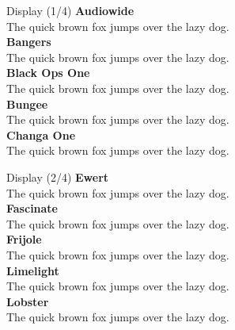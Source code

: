 \documentclass[10pt]{beamer}
\begin{document}
\begin{frame}{Display (1/4)}
\vspace{-0.2cm}
  {\AudiowideLocal\Large\bfseries Audiowide\\}
  {\AudiowideLocal The quick brown fox jumps over the lazy dog.\\[0.3cm]}
  {\BangersLocal\Large\bfseries Bangers\\}
  {\BangersLocal The quick brown fox jumps over the lazy dog.\\[0.3cm]}
  {\BlackOpsOneLocal\Large\bfseries Black Ops One\\}
  {\BlackOpsOneLocal The quick brown fox jumps over the lazy dog.\\[0.3cm]}
  {\BungeeLocal\Large\bfseries Bungee\\}
  {\BungeeLocal The quick brown fox jumps over the lazy dog.\\[0.3cm]}
  {\ChangaOneLocal\Large\bfseries Changa One\\}
  {\ChangaOneLocal The quick brown fox jumps over the lazy dog.\\[0.3cm]}
\end{frame}

\begin{frame}{Display (2/4)}
\vspace{-0.2cm}
  {\EwertLocal\Large\bfseries Ewert\\}
  {\EwertLocal The quick brown fox jumps over the lazy dog.\\[0.3cm]}
  {\FascinateLocal\Large\bfseries Fascinate\\}
  {\FascinateLocal The quick brown fox jumps over the lazy dog.\\[0.3cm]}
  {\FrijoleLocal\Large\bfseries Frijole\\}
  {\FrijoleLocal The quick brown fox jumps over the lazy dog.\\[0.3cm]}
  {\LimelightLocal\Large\bfseries Limelight\\}
  {\LimelightLocal The quick brown fox jumps over the lazy dog.\\[0.3cm]}
  {\LobsterLocal\Large\bfseries Lobster\\}
  {\LobsterLocal The quick brown fox jumps over the lazy dog.\\[0.3cm]}
\end{frame}
\end{document}
